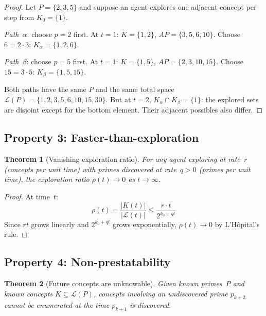 \documentclass[11pt,a4paper]{article}
\newtheorem{theorem}{Theorem}
\begin{document}
\begin{proof}
Let $P = \{2, 3, 5\}$ and suppose an agent explores one adjacent concept
per step from $K_0 = \{1\}$.

\emph{Path~$\alpha$}: choose $p = 2$ first. At $t = 1$:
$K = \{1, 2\}$, $AP = \{3, 5, 6, 10\}$. Choose $6 = 2 \cdot 3$:
$K_\alpha = \{1, 2, 6\}$.

\emph{Path~$\beta$}: choose $p = 5$ first. At $t = 1$:
$K = \{1, 5\}$, $AP = \{2, 3, 10, 15\}$. Choose $15 = 3 \cdot 5$:
$K_\beta = \{1, 5, 15\}$.

Both paths have the same $P$ and the same total space
$\mathcal{L}(P) = \{1, 2, 3, 5, 6, 10, 15, 30\}$. But at $t = 2$,
$K_\alpha \cap K_\beta = \{1\}$: the explored sets are disjoint except
for the bottom element. Their adjacent possibles also differ.
\end{proof}

\subsection{Property 3: Faster-than-exploration}

\begin{theorem}[Vanishing exploration ratio]
\label{thm:faster}
For any agent exploring at rate~$r$ (concepts per unit time) with primes
discovered at rate~$q > 0$ (primes per unit time), the exploration ratio
$\rho(t) \to 0$ as $t \to \infty$.
\end{theorem}

\begin{proof}
At time~$t$:
\begin{equation}
\rho(t) = \frac{|K(t)|}{|\mathcal{L}(t)|}
  \leq \frac{r \cdot t}{2^{k_0 + qt}}
\end{equation}
Since $rt$ grows linearly and $2^{k_0 + qt}$ grows exponentially,
$\rho(t) \to 0$ by L'H\^opital's rule.
\end{proof}

\subsection{Property 4: Non-prestatability}

\begin{theorem}[Future concepts are unknowable]
\label{thm:nonprestate}
Given known primes~$P$ and known concepts $K \subseteq \mathcal{L}(P)$,
concepts involving an undiscovered prime $p_{k+2}$ cannot be enumerated
at the time $p_{k+1}$ is discovered.
\end{theorem}
\end{document}
